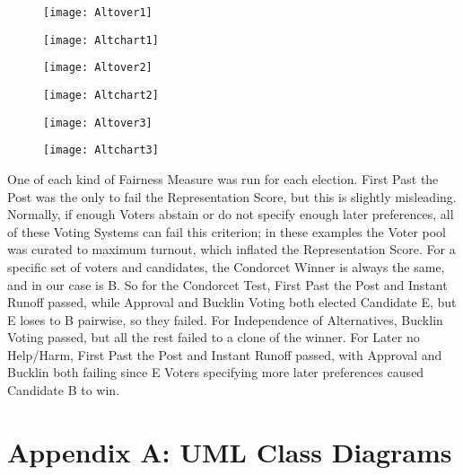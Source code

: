 \documentclass[12pt]{article}
\begin{document}
\begin{figure}[H]
\centering
\texttt{[image: Altover1]}
\end{figure}
\begin{figure}[H]
\centering
\texttt{[image: Altchart1]}
\end{figure}
\begin{figure}[H]
\centering
\texttt{[image: Altover2]}
\end{figure}
\begin{figure}[H]
\centering
\texttt{[image: Altchart2]}
\end{figure}
\begin{figure}[H]
\centering
\texttt{[image: Altover3]}
\end{figure}
\begin{figure}[H]
\centering
\texttt{[image: Altchart3]}
\end{figure}

\qquad One of each kind of Fairness Measure was run for each election. First Past the Post was the only to fail the Representation Score, but this is slightly misleading. Normally, if enough Voters abstain or do not specify enough later preferences, all of these Voting Systems can fail this criterion; in these examples the Voter pool was curated to maximum turnout, which inflated the Representation Score. For a specific set of voters and candidates, the Condorcet Winner is always the same, and in our case is B. So for the Condorcet Test, First Past the Post and Instant Runoff passed, while Approval and Bucklin Voting both elected Candidate E, but E loses to B pairwise, so they failed. For Independence of Alternatives, Bucklin Voting passed, but all the rest failed to a clone of the winner. For Later no Help/Harm, First Past the Post and Instant Runoff passed, with Approval and Bucklin both failing since E Voters specifying more later preferences caused Candidate B to win.

\newpage
\section{Appendix A: UML Class Diagrams} \label{AppA}
\end{document}
